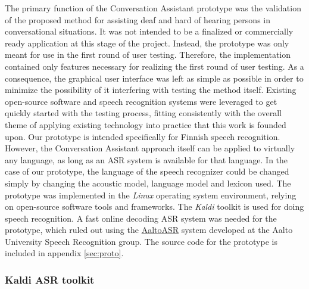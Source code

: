 \documentclass[english, 12pt, a4paper, pdftex, elec, utf8]{aaltothesis}
\begin{document}
The primary function of the Conversation Assistant prototype was the validation of the proposed method for assisting deaf and hard of hearing persons in conversational situations. It was not intended to be a finalized or commercially ready application at this stage of the project. Instead, the prototype was only meant for use in the first round of user testing. Therefore, the implementation contained only features necessary for realizing the first round of user testing. As a consequence, the graphical user interface was left as simple as possible in order to minimize the possibility of it interfering with testing the method itself. Existing open-source software and speech recognition systems were leveraged to get quickly started with the testing process, fitting consistently with the overall theme of applying existing technology into practice that this work is founded upon. Our prototype is intended specifically for Finnish speech recognition. However, the Conversation Assistant approach itself can be applied to virtually any language, as long as an ASR system is available for that language. In the case of our prototype, the language of the speech recognizer could be changed simply by changing the acoustic model, language model and lexicon used. The prototype was implemented in the \textit{Linux} operating system environment, relying on open-source software tools and frameworks. The \textit{Kaldi} toolkit is used for doing speech recognition. A fast online decoding ASR system was needed for the prototype, which ruled out using the \href{https://github.com/aalto-speech/AaltoASR}{AaltoASR} system developed at the Aalto University Speech Recognition group. The source code for the prototype is included in appendix \ref{sec:proto}. 

\subsubsection{Kaldi ASR toolkit} \label{sec:kaldi}
\end{document}
